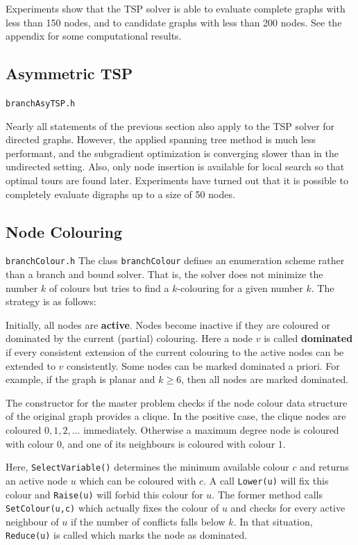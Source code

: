 \documentclass[a4paper,11pt,twoside]{book}
\begin{document}
\begin{multicols}{2}
Experiments show that the TSP solver is able to evaluate complete graphs
with less than 150 nodes, and to candidate graphs with less than 200 nodes. See
the appendix for some computational results.


\subsection{Asymmetric TSP}
\label{slb_branchAsyTSP}
\myinclude\verb/branchAsyTSP.h/

\noindent
Nearly all statements of the previous section also apply to the TSP solver for
directed graphs. However, the applied spanning tree method is much
less performant, and the subgradient optimization is converging slower than in
the undirected setting. Also, only node insertion is available for local search
so that optimal tours are found later. Experiments have turned out that it is
possible to completely evaluate digraphs up to a size of 50 nodes.


\subsection{Node Colouring}
\label{slb_branchColour}
\myinclude\verb/branchColour.h/
\noindent
The class \verb/branchColour/ defines an enumeration scheme rather than a branch
and bound solver. That is, the solver does not minimize the number $k$ of
colours but tries to find a $k$-colouring for a given number $k$. The strategy
is as follows:

Initially, all nodes are {\bf active}.
Nodes become inactive if they are coloured or dominated by the current
(partial) colouring. Here a node $v$ is called {\bf dominated}
 if every consistent extension of the
current colouring to the active nodes can be extended to $v$ consistently. Some
nodes can be marked dominated a priori. For example, if the graph is planar
and $k\geq 6$, then all nodes are marked dominated.

The constructor for the master problem checks if the node colour data structure
of the original graph provides a clique. In the positive case, the clique nodes
are coloured $0,1,2,\dots$ immediately. Otherwise a maximum degree node is
coloured with colour $0$, and one of its neighbours is coloured with colour $1$.

Here, \verb/SelectVariable()/ determines the minimum available colour $c$ and
returns an active node $u$ which can be coloured with $c$. A call
\verb/Lower(u)/ will fix this colour and \verb/Raise(u)/ will forbid this
colour for $u$. The former method calls \verb/SetColour(u,c)/ which actually
fixes the colour of $u$ and checks for every active neighbour of $u$ if the
number of conflicts falls below $k$. In that situation, \verb/Reduce(u)/ is
called which marks the node as dominated.


\end{multicols}
\end{document}
